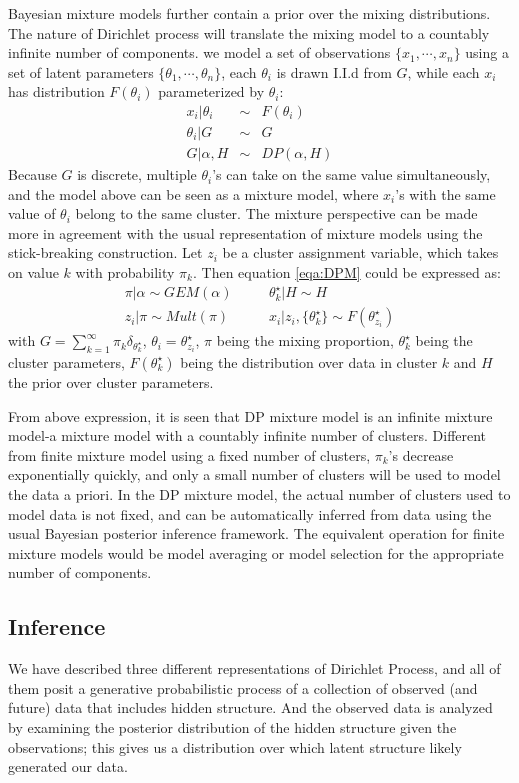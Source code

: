 \documentclass[a4paper,14pt]{article}
\begin{document}
Bayesian mixture models further contain a prior over the mixing distributions. The nature of Dirichlet process will translate the mixing model to a countably infinite number of components. we model a set of observations $\{x_1,\cdots,x_n\}$ using a set of latent parameters  $\{\theta_1,\cdots,\theta_n\}$, each $\theta_i$ is drawn I.I.d from $G$, while each $x_i$ has distribution $F(\theta_i)$ parameterized by $\theta_i$:
\begin{eqnarray}
x_i|\theta_i&\sim& F(\theta_i)\\
\theta_i|G&\sim& G\\
G|\alpha,H&\sim& DP(\alpha,H)
\end{eqnarray}\label{eqa:DPM}
Because $G$ is discrete, multiple $\theta_i$'s can take on the same value simultaneously, and the model above can be seen as a mixture model, where $x_i$'s with the same value of $\theta_i$ belong to the same cluster. The mixture perspective can be made more in agreement with the usual representation of mixture models using the stick-breaking construction. Let $z_i$ be a cluster assignment variable, which takes on value $k$ with probability $\pi_k$. Then equation \ref{eqa:DPM} could be expressed as:
\begin{eqnarray}
\pi|\alpha\sim GEM(\alpha)& \quad &\theta_k^\star|H\sim H \\
z_i|\pi\sim  Mult(\pi)& \quad & x_i|z_i,\{\theta_k^\star\} \sim F(\theta_{z_i}^\star)
\end{eqnarray}
with $G=\sum\nolimits_{k=1}^\infty\pi_k\delta_{\theta_k^\star}$,  $\theta_i=\theta_{z_i}^\star$, $\pi$ being the mixing proportion, $\theta_k^\star$ being the cluster parameters, $F(\theta_k^\star)$ being the distribution over data in cluster $k$ and $H$ the prior over cluster parameters.

From above expression, it is seen that DP mixture model is an infinite mixture model-a mixture model with a countably infinite number of clusters. Different from finite mixture model using a fixed number of clusters, $\pi_k$'s decrease exponentially quickly, and only a small number of clusters will be used to model the data a priori. In the DP mixture model, the actual number of clusters used to model data is not fixed, and can be automatically inferred from data using the usual Bayesian posterior inference framework. The equivalent operation for finite mixture models would be model averaging or model selection for the appropriate number of components. 
\\


\subsection{Inference}
We have described three different representations of Dirichlet Process, and all of them posit a generative probabilistic process of a collection of observed (and future) data that includes hidden structure. And the observed data is analyzed by examining the posterior distribution of the hidden structure given the observations; this gives us a distribution over which latent structure likely generated our data. 
\end{document}
